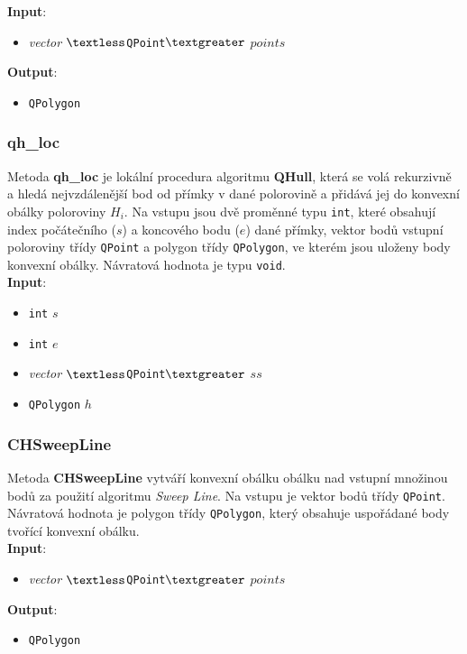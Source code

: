\documentclass[a4paper, 12pt]{article}
\begin{document}
\textbf{Input}:
\begin{itemize}
\item \textsl{vector} $\textless$\texttt{QPoint}$\textgreater$ $points$
\end{itemize}

\textbf{Output}:
\begin{itemize}
\item \texttt{QPolygon}
\end{itemize}

\subsubsection{qh\_loc}
Metoda \textbf{qh\_loc} je lokální procedura algoritmu \textbf{QHull}, která se volá rekurzivně a hledá nejvzdálenější bod od přímky v dané polorovině a přidává jej do konvexní obálky poloroviny $H_i$. Na vstupu jsou dvě proměnné typu \texttt{int}, které obsahují index počátečního ($s$) a koncového bodu ($e$) dané přímky, vektor bodů vstupní poloroviny třídy \texttt{QPoint} a polygon třídy \texttt{QPolygon}, ve kterém jsou uloženy body konvexní obálky. Návratová hodnota je typu \texttt{void}.\\

\textbf{Input}:
\begin{itemize}
\item \texttt{int} $s$
\item \texttt{int} $e$
\item \textsl{vector} $\textless$\texttt{QPoint}$\textgreater$ $ss$
\item \texttt{QPolygon} $h$
\end{itemize}

\subsubsection{CHSweepLine}
Metoda \textbf{CHSweepLine} vytváří konvexní obálku obálku nad vstupní množinou bodů za použití algoritmu \textit{Sweep Line}. Na vstupu je vektor bodů třídy \texttt{QPoint}. Návratová hodnota je polygon třídy \texttt{QPolygon}, který obsahuje uspořádané body tvořící konvexní obálku.\\

\textbf{Input}:
\begin{itemize}
\item \textsl{vector} $\textless$\texttt{QPoint}$\textgreater$ $points$
\end{itemize}

\textbf{Output}:
\begin{itemize}
\item \texttt{QPolygon}
\end{itemize}
\end{document}
